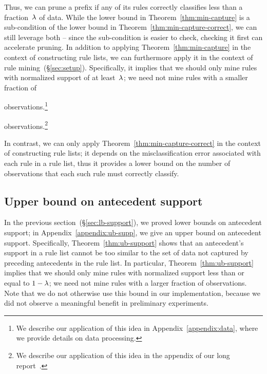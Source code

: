 Thus, we can prune a prefix if any of its rules correctly classifies
less than a fraction~${\lambda}$ of data.
%
While the lower bound in Theorem~\ref{thm:min-capture} is a sub-condition
of the lower bound in Theorem~\ref{thm:min-capture-correct},
we can still leverage both -- since the sub-condition is easier to check,
checking it first can accelerate pruning.
%
In addition to applying Theorem~\ref{thm:min-capture} in the context of
constructing rule lists, we can furthermore apply it in the context of
rule mining~(\S\ref{sec:setup}).
%
Specifically, it implies that we should only mine rules with
normalized support of at least~${\lambda}$;
we need not mine rules with a smaller fraction of
\begin{arxiv}
observations.\footnote{We describe our application of this idea in
Appendix~\ref{appendix:data}, where we provide details on data processing.}
\end{arxiv}
\begin{kdd}
observations.\footnote{We describe our application of this idea in the appendix
of our long report~\citep{AngelinoLaAlSeRu17}.}
\end{kdd}
%
In contrast, we can only apply Theorem~\ref{thm:min-capture-correct}
in the context of constructing rule lists;
it depends on the misclassification error associated with each
rule in a rule list, thus it provides a lower bound on the number of
observations that each such rule must correctly classify.

\begin{arxiv}
\subsection{Upper bound on antecedent support}
\label{sec:ub-support}

In the previous section~(\S\ref{sec:lb-support}), we proved lower bounds on
antecedent support; in Appendix~\ref{appendix:ub-supp},
we give an upper bound on antecedent support.
%
Specifically, Theorem~\ref{thm:ub-support} shows that an antecedent's
support in a rule list cannot be too similar to the set of data not
captured by preceding antecedents in the rule list.
%
In particular, Theorem~\ref{thm:ub-support} implies that we should
only mine rules with normalized support less than or equal to ${1 - {\lambda}}$;
we need not mine rules with a larger fraction of observations.
%
Note that we do not otherwise use this bound in our implementation,
because we did not observe a meaningful benefit in preliminary experiments.
\end{arxiv}

